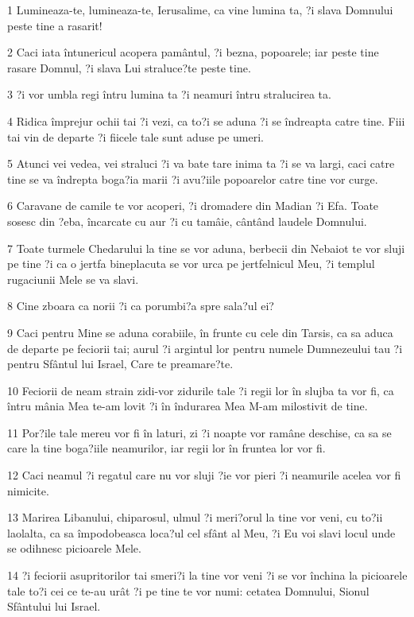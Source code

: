 \par 1 Lumineaza-te, lumineaza-te, Ierusalime, ca vine lumina ta, ?i slava Domnului peste tine a rasarit!
\par 2 Caci iata întunericul acopera pamântul, ?i bezna, popoarele; iar peste tine rasare Domnul, ?i slava Lui straluce?te peste tine.
\par 3 ?i vor umbla regi întru lumina ta ?i neamuri întru stralucirea ta.
\par 4 Ridica împrejur ochii tai ?i vezi, ca to?i se aduna ?i se îndreapta catre tine. Fiii tai vin de departe ?i fiicele tale sunt aduse pe umeri.
\par 5 Atunci vei vedea, vei straluci ?i va bate tare inima ta ?i se va largi, caci catre tine se va îndrepta boga?ia marii ?i avu?iile popoarelor catre tine vor curge.
\par 6 Caravane de camile te vor acoperi, ?i dromadere din Madian ?i Efa. Toate sosesc din ?eba, încarcate cu aur ?i cu tamâie, cântând laudele Domnului.
\par 7 Toate turmele Chedarului la tine se vor aduna, berbecii din Nebaiot te vor sluji pe tine ?i ca o jertfa bineplacuta se vor urca pe jertfelnicul Meu, ?i templul rugaciunii Mele se va slavi.
\par 8 Cine zboara ca norii ?i ca porumbi?a spre sala?ul ei?
\par 9 Caci pentru Mine se aduna corabiile, în frunte cu cele din Tarsis, ca sa aduca de departe pe feciorii tai; aurul ?i argintul lor pentru numele Dumnezeului tau ?i pentru Sfântul lui Israel, Care te preamare?te.
\par 10 Feciorii de neam strain zidi-vor zidurile tale ?i regii lor în slujba ta vor fi, ca întru mânia Mea te-am lovit ?i în îndurarea Mea M-am milostivit de tine.
\par 11 Por?ile tale mereu vor fi în laturi, zi ?i noapte vor ramâne deschise, ca sa se care la tine boga?iile neamurilor, iar regii lor în fruntea lor vor fi.
\par 12 Caci neamul ?i regatul care nu vor sluji ?ie vor pieri ?i neamurile acelea vor fi nimicite.
\par 13 Marirea Libanului, chiparosul, ulmul ?i meri?orul la tine vor veni, cu to?ii laolalta, ca sa împodobeasca loca?ul cel sfânt al Meu, ?i Eu voi slavi locul unde se odihnesc picioarele Mele.
\par 14 ?i feciorii asupritorilor tai smeri?i la tine vor veni ?i se vor închina la picioarele tale to?i cei ce te-au urât ?i pe tine te vor numi: cetatea Domnului, Sionul Sfântului lui Israel.
